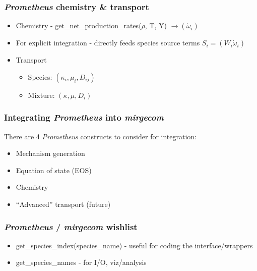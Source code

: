 \begin{frame}\frametitle{\textit{Prometheus} chemistry \& transport}
\begin{itemize}
\item Chemistry - get\_net\_production\_rates($\rho$, T, Y) $\rightarrow (\dot{\omega}_i)$
\item For explicit integration - directly feeds species source terms $S_i = (W_i \dot{\omega}_i)$
\item Transport
   \begin{itemize}
      \item Species:  $(\kappa_i, \mu_i, D_{ij})$
      \item Mixture: $(\kappa, \mu, D_i)$
   \end{itemize}
\end{itemize}
\end{frame}

\begin{frame}\frametitle{Integrating \textit{Prometheus} into \textit{mirgecom}}
There are 4 \textit{Prometheus} constructs to consider for integration:
\begin{itemize}
\item Mechanism generation
\item Equation of state (EOS)
\item Chemistry
\item ``Advanced'' transport (future)
\end{itemize}
\end{frame}


\begin{frame}\frametitle{\textit{Prometheus} / \textit{mirgecom} wishlist}
\begin{itemize}
   \item get\_species\_index(species\_name) - useful for coding the interface/wrappers
   \item get\_species\_names - for I/O, viz/analysis
\end{itemize}           
\end{frame}






